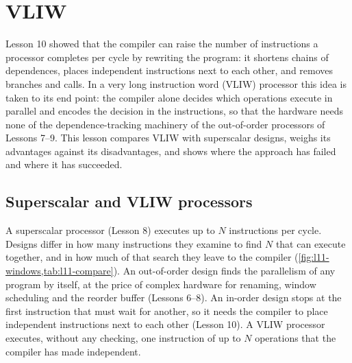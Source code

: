\documentclass[../main.tex]{subfiles}
\begin{document}
\chapter{VLIW}

Lesson 10 showed that the compiler can raise the number of instructions a
processor completes per cycle by rewriting the program: it shortens chains of
dependences, places independent instructions next to each other, and removes
branches and calls.  In a very long instruction word (VLIW) processor this
idea is taken to its end point: the compiler alone decides which operations
execute in parallel and encodes the decision in the instructions, so that the
hardware needs none of the dependence-tracking machinery of the out-of-order
processors of Lessons 7--9.  This lesson compares VLIW with superscalar
designs, weighs its advantages against its disadvantages, and shows where the
approach has failed and where it has succeeded.

\section{Superscalar and VLIW processors}
\label{sec:l11-superscalar-vs-vliw}

A superscalar processor (Lesson 8) executes up to $N$
instructions per cycle.  Designs differ in how many instructions they examine to
find $N$ that can execute together, and in how much of that search they leave
to the compiler (\cref{fig:l11-windows,tab:l11-compare}).  An out-of-order
design finds the parallelism of any program by itself, at the price of complex
hardware for renaming, window scheduling and the reorder buffer (Lessons
6--8).  An in-order design stops at the first instruction that must wait for
another, so it needs the compiler to place independent instructions next to
each other (Lesson 10).  A VLIW processor executes, without any checking, one
instruction of up to $N$ operations that the compiler has made
independent.
\end{document}
